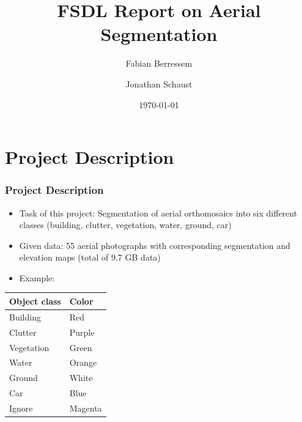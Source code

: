 \documentclass{beamer}
\title{FSDL Report on Aerial Segmentation}
\author{Fabian Berressem \and Jonathan Schaust}
\date{\today}
\begin{document}
\begin{frame}
\titlepage
\end{frame}

\section{Project Description}

\begin{frame}
\frametitle{Project Description}
\begin{itemize}
\item Task of this project: Segmentation of aerial orthomosaics into six different classes (building, clutter, vegetation, water, ground, car)
\item Given data: 55 aerial photographs with corresponding segmentation and elevation maps (total of 9.7 GB data)
\item Example:
\end{itemize}
\vspace*{0.5cm}
\begin{minipage}{0.65\textwidth}
\centering
\begin{figure}
\end{figure}
\end{minipage}
\hspace*{0.3cm}
\begin{minipage}{0.15\textwidth}
\begin{table}
\centering
\scriptsize
\begin{tabular}{ l|l  }
 Object class & Color\\
 \toprule
 Building & Red  \\ 
 Clutter & Purple  \\
 Vegetation & Green   \\ 
 Water & Orange  \\
 Ground & White   \\ 
 Car & Blue   \\
 Ignore & Magenta
\end{tabular}
\end{table}
\end{minipage}
\end{frame}
\end{document}
